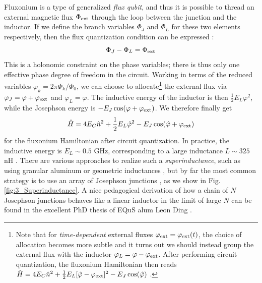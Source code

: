 Fluxonium is a type of generalized \textit{flux qubit}, and thus it is possible to thread an external magnetic flux $\Phi_{\rm ext}$ through the loop between the junction and the inductor. If we define the branch variables $\Phi_J$ and $\Phi_L$ for these two elements respectively, then the flux quantization condition can be expressed \cite{orlando1991foundations}:
\begin{equation}
    \Phi_J - \Phi_L = \Phi_{\rm ext}
\end{equation}
This is a holonomic constraint on the phase variables; there is thus only one effective phase degree of freedom in the circuit. Working in terms of the reduced variables $\varphi_k = 2\pi \Phi_k/\Phi_0$, we can choose to allocate\footnote{Note that for \textit{time-dependent} external fluxes $\varphi_{\rm ext} = \varphi_{\rm ext}(t)$, the choice of allocation becomes more subtle and it turns out we should instead group the external flux with the inductor $\varphi_L = \varphi - \varphi_{\rm ext}$. After performing circuit quantization, the fluxonium Hamiltonian then reads $\hat{H} = 4E_C \hat{n}^2 + \frac{1}{2}E_L[\hat{\varphi} - \varphi_{\rm ext}]^2 - E_J\cos(\hat{\varphi})$ \cite{you2019circuit}.} the external flux via $\varphi_J = \varphi + \varphi_{\rm ext}$ and $\varphi_L = \varphi$. The inductive energy of the inductor is then $\frac{1}{2}E_L\varphi^2$, while the Josephson energy is $-E_J\cos(\varphi + \varphi_{\rm ext})$. We therefore finally get
\begin{equation}
    \hat{H} = 4E_C \hat{n}^2 + \frac{1}{2}E_L\hat{\varphi}^2 - E_J\cos(\hat{\varphi} + \varphi_{\rm ext})
    \label{eq:3_fluxonium_H}
\end{equation}
for the fluxonium Hamiltonian after circuit quantization. In practice, the inductive energy is $E_L \sim 0.5$ GHz, corresponding to a large inductance $L \sim 325$ nH \cite{nguyen2022blueprint}. There are various approaches to realize such a \textit{superinductance}, such as using granular aluminum \cite{maleeva2018circuit, grunhaupt2019granular, kamenov2020granular, rieger2023granular} or geometric inductances \cite{peruzzo2020surpassing, peruzzo2021geometric}, but by far the most common strategy is to use an array of Josephson junctions \cite{manucharyan2009fluxonium, masluk2012microwave}, as we show in Fig. \ref{fig:3_Superinductance}. A nice pedagogical derivation of how a chain of $N$ Josephson junctions behaves like a linear inductor in the limit of large $N$ can be found in the excellent PhD thesis of EQuS alum Leon Ding \cite{ding2023thesis}. 

